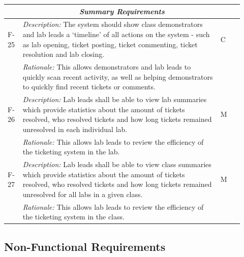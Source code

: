  \begin{table}[H]
\small
\begin{tabular}{|p{0.05\linewidth} | p{0.78\linewidth} |p{0.09\linewidth}|}
 
  \multicolumn{3}{c}{\textit{\textbf{Summary Requirements}}}\\
  
          \hline
 F-25 & \textit{Description:} The system should show class demonstrators and lab leads a `timeline' of all actions on the system - such as lab opening, ticket posting, ticket commenting, ticket resolution and lab closing. & C\\
  \cline{2-2}
  & \textit{Rationale:} This allows demonstrators and lab leads to quickly scan recent activity, as well as helping demonstrators to quickly find recent tickets or comments. & \\
  
\hline\hline
 F-26 & \textit{Description:} Lab leads shall be able to view lab summaries which provide statistics about the amount of tickets resolved, who resolved tickets and how long tickets remained unresolved in each individual lab. & M\\
  \cline{2-2}
  & \textit{Rationale:} This allows lab leads to review the efficiency of the ticketing system in the lab. & \\

 \hline\hline
 F-27 & \textit{Description:} Lab leads shall be able to view class summaries which provide statistics about the amount of tickets resolved, who resolved tickets and how long tickets remained unresolved for all labs in a given class. & M\\
  \cline{2-2}
  & \textit{Rationale:} This allows lab leads to review the efficiency of the ticketing system in the class. & \\
  \hline
  
\end{tabular}
\end{table}

\subsection{Non-Functional Requirements}

